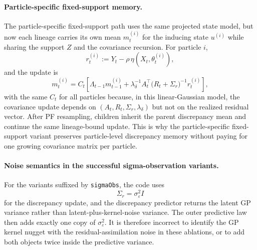 \documentclass{article}
\begin{document}
\paragraph{Particle-specific fixed-support memory.}
The particle-specific fixed-support path uses the same projected state model, but now each lineage carries its own mean $m_t^{(i)}$ for the inducing state $u^{(i)}$ while sharing the support $Z$ and the covariance recursion. For particle $i$,
\begin{equation}
r_t^{(i)}
:=
Y_t-\rho\,\eta(X_t,\theta_t^{(i)}),
\label{eq:particle_fixedsupport_residual}
\end{equation}
and the update is
\begin{equation}
m_t^{(i)}
=
C_t
\left[
\Lambda_{t-1} m_{t-1}^{(i)}
+
\lambda_\delta^{-1}
A_t^\top
\big(R_t+\Sigma_r\big)^{-1}
r_t^{(i)}
\right],
\label{eq:particle_fixedsupport_mean_update}
\end{equation}
with the same $C_t$ for all particles because, in this linear-Gaussian model, the covariance update depends on $(A_t,R_t,\Sigma_r,\lambda_\delta)$ but not on the realized residual vector. After PF resampling, children inherit the parent discrepancy mean and continue the same lineage-bound update. This is why the particle-specific fixed-support variant preserves particle-level discrepancy memory without paying for one growing covariance matrix per particle.

\paragraph{Noise semantics in the successful sigma-observation variants.}
For the variants suffixed by \texttt{sigmaObs}, the code uses
\begin{equation}
\Sigma_r = \sigma_\varepsilon^2 I
\label{eq:sigmaobs_residual_noise}
\end{equation}
for the discrepancy update, and the discrepancy predictor returns the latent GP variance rather than latent-plus-kernel-noise variance. The outer predictive law then adds exactly one copy of $\sigma_\varepsilon^2$. It is therefore incorrect to identify the GP kernel nugget with the residual-assimilation noise in these ablations, or to add both objects twice inside the predictive variance.
\end{document}
